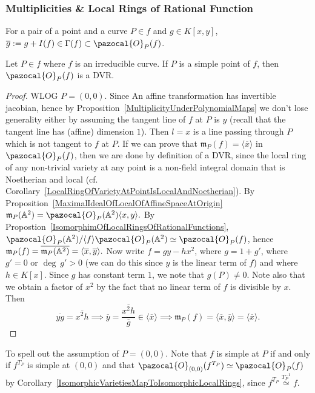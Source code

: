    \subsubsection{Multiplicities \& Local Rings of Rational Function}\label{MultAndLocRings}
    For a pair of a point and a curve $P\in f$ and $g\in K[x,y]$, $\overline{g} := g+ I(f) \in \Gamma(f)\subset \pazocal{O}_P(f)$. 
    \begin{lemma}\label{FirstImplicationOfSimplePointDVRCorrespondence}
         Let $P\in f$ where $f$ is an irreducible curve. If $P$ is a simple point of $f$, then $\pazocal{O}_P(f)$ is a DVR. 
    \end{lemma}
    \begin{proof}
        WLOG $P=(0,0)$. Since An affine transformation has invertible jacobian, hence by Proposition~\ref{MultiplicityUnderPolynomialMaps} we don't lose generality either by assuming the tangent line of $f$ at $P$ is $y$ (recall that the tangent line has (affine) dimension $1$). Then $l=x$ is a line passing through $P$ which is not tangent to $f$ at $P$. If we can prove that $\mathfrak{m}_P(f)=\langle \overline{x}\rangle$ in $\pazocal{O}_P(f)$, then we are done by definition of a DVR, since the local ring of any non-trivial variety at any point is a non-field integral domain that is Noetherian and local (cf. Corollary~\ref{LocalRingOfVarietyAtPointIsLocalAndNoetherian}). By Proposition~\ref{MaximalIdealOfLocalOfAffineSpaceAtOrigin} $\mathfrak{m}_P(\A^2)=\pazocal{O}_P(\A^2)\langle x,y\rangle.$ By Propostion~\ref{IsomorphimOfLocalRingsOfRationalFunctions}, $\pazocal{O}_P(\A^2)/\langle f\rangle \pazocal{O}_P(\A^2) \simeq \pazocal{O}_P(f)$, hence $\mathfrak{m}_P(f) = \overline{\mathfrak{m}_P(\mathbb{A}^2)}= \langle \overline{x},\overline{y} \rangle.$  Now write $f=gy-hx^2$, where $g=1+g'$, where $g'=0$ or $\deg \ g' >0$ (we can do this since $y$ is the linear term of $f$) and where $h\in K[x]$. Since $g$ has constant term $1$, we note that $g(P)\neq 0$. Note also that  we obtain a factor of $x^2$ by the fact that no linear term of $f$ is divisible by $x$. Then 
        $$\overline{yg}=\overline{x^2h}\implies \overline{y} = \frac{\overline{x^2h}}{\overline{g}}\in \langle \overline{x}\rangle \implies \mathfrak{m}_P(f) = \langle \overline{x},\overline{y}\rangle = \langle \overline{x}\rangle.$$
    \end{proof}
    \begin{remark}
        To spell out the assumption of $P=(0,0)$. Note that $f$ is simple at $P$ if and only if $f^{T_P}$ is simple at $(0,0)$  and that $\pazocal{O}_{(0,0)} (f^{T_P})\simeq \pazocal{O}_P(f)$ by Corollary~\ref{IsomorphicVarietiesMapToIsomorphicLocalRings}, since $f^{T_P}\overset{T_P^{-1}}{\simeq} f$.
    \end{remark}

